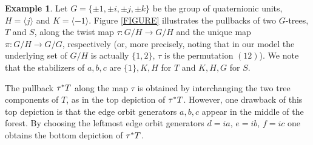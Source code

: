 \documentclass[a4paper,10pt
,draft
]{article}%
\numberwithin{equation}{section}
\numberwithin{figure}{section}
\theoremstyle{definition} %
\newtheorem{example}[equation]{Example}%
\newcommand{\1}{\ensuremath{\mathbbm 1}}%
\begin{document}
\begin{example}\label{ROOTPULL EX}
Let $G=\{\pm 1, \pm i, \pm j, \pm k\}$ be the group of quaternionic units, 
$H = \langle j \rangle$ and $K = \langle -1 \rangle$.
Figure \ref{FIGURE} illustrates the pullbacks of two $G$-trees, 
$T$ and $S$,
along the 
twist map $\tau \colon G/H \to G/H$
and the unique map $\pi \colon G/H \to G/G$, respectively
(or, more precisely, noting that in our model the underlying set 
of $G/H$ is actually $\{1,2\}$,
$\tau$ is the permutation $(12)$).
We note that the stabilizers of $a,b,c$ are $\{1\},K,H$ for $T$
and $K,H,G$ for $S$.

The pullback $\tau^{\**} T$ along the map $\tau$
is obtained by interchanging the two tree components of $T$,
as in the top depiction of $\tau^{\**} T$. 
However, one drawback of this top depiction 
is that the edge orbit generators $a,b,c$
appear in the middle of the forest.
By choosing the leftmost 
edge orbit generators
$d = i a$, $e = i b$, $f = i c$ one obtains the
bottom depiction of $\tau^{\**} T$. 


\end{example}
\end{document}
